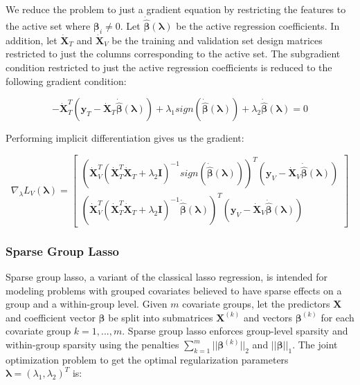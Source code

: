 \documentclass[10pt,letterpaper]{article}
\begin{document}
We reduce the problem to just a gradient equation by restricting the features to the active set where $\boldsymbol \beta_i \ne 0$. Let $\dot{\hat{\boldsymbol{\beta}}}(\boldsymbol \lambda)$ be the active regression coefficients. In addition, let $\dot{\boldsymbol{X}}_T$ and $\dot{\boldsymbol{X}}_V$ be the training and validation set design matrices restricted to just the columns corresponding to the active set. The subgradient condition restricted to just the active regression coefficients is reduced to the following gradient condition:

\begin{equation}
-\dot{\boldsymbol{X}}_T^T(\boldsymbol y_T - \dot{\boldsymbol{X}}_T \dot{\hat{\boldsymbol{\beta}}} (\boldsymbol{\lambda}) )
+ \lambda_1 sign(\dot{\hat{\boldsymbol{\beta}}} (\boldsymbol{\lambda}))
+ \lambda_2 \dot{\hat{\boldsymbol{\beta}}}(\boldsymbol{\lambda}) = 0
\end{equation}

Performing implicit differentiation gives us the gradient:

\begin{equation}
\nabla_\lambda L_V(\boldsymbol{\lambda}) =
\begin{bmatrix}
(\dot{\boldsymbol{X}}_V^T(\dot{\boldsymbol{X}}_T^T \dot{\boldsymbol{X}}_T + \lambda_2 \boldsymbol{I})^{-1}
sign(\dot{\hat{\boldsymbol{\beta}}} (\boldsymbol{\lambda})))^T
(\boldsymbol y_V - \dot{\boldsymbol{X}}_V \dot{\hat{\boldsymbol{\beta}}} (\boldsymbol{\lambda}))\\
(\dot{\boldsymbol{X}}_V^T(\dot{\boldsymbol{X}}_T^T \dot{\boldsymbol{X}}_T + \lambda_2 \boldsymbol{I})^{-1} \dot{\hat{\boldsymbol{\beta}}} (\boldsymbol{\lambda}))^T
(\boldsymbol y_V - \dot{\boldsymbol{X}}_V \dot{\hat{\boldsymbol{\beta}}} (\boldsymbol{\lambda}))
\end{bmatrix}
\end{equation}

\subsubsection{Sparse Group Lasso}

Sparse group lasso, a variant of the classical lasso regression, is intended for modeling problems with grouped covariates believed to have sparse effects on a group and a within-group level. Given $m$ covariate groups, let the predictors $\boldsymbol{X}$ and coefficient vector $\boldsymbol \beta$ be split into submatrices $\boldsymbol{X}^{(k)}$ and vectors $\boldsymbol \beta^{(k)}$ for each covariate group $k = 1, ... , m$. Sparse group lasso enforces group-level sparsity and within-group sparsity using the penalties $\sum_{k=1}^m \lvert\lvert \boldsymbol\beta^{(k)} \rvert \rvert_2$ and $||\boldsymbol\beta ||_1$. The joint optimization problem to get the optimal regularization parameters $\boldsymbol{\lambda} = (\lambda_1, \lambda_2)^T$ is:
\end{document}
